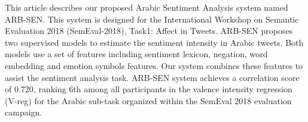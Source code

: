 This article describes our proposed Arabic Sentiment Analysis system named ARB-SEN. This system is designed for the International Workshop on Semantic Evaluation 2018 (SemEval-2018), Task1:  Affect in Tweets.  ARB-SEN proposes two supervised models to estimate the sentiment intensity in Arabic tweets. Both models use a set of features including sentiment lexicon, negation, word embedding and emotion symbols features.   Our system combines these features to assist the sentiment analysis task. ARB-SEN system achieves a correlation score of 0.720, ranking 6th among all participants in the valence intensity regression (V-reg) for the Arabic sub-task organized within the SemEval 2018 evaluation campaign.
